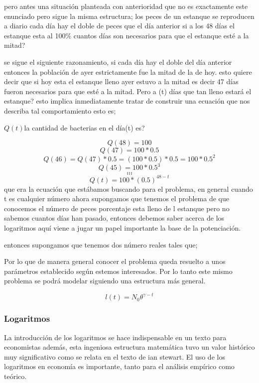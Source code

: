 \documentclass[12pt]{article}
\begin{document}
{pero antes una situación planteada con anterioridad que no es exactamente este enunciado pero sigue la misma estructura; los peces de un estanque se reproducen a diario cada día hay el doble de peces que el día anterior si a los 48 días el estanque esta al 100\% cuantos días son necesarios para que el estanque esté  a la mitad?

se sigue el siguiente razonamiento, si cada día hay el doble del día anterior entonces la población de ayer estrictamente fue la mitad de la de hoy. esto quiere decir que si hoy esta el estanque lleno ayer estuvo a la mitad es decir 47 días fueron necesarios para que esté a la mitad. Pero a (t) días que tan lleno estará el estanque? esto implica inmediatamente tratar de construir una ecuación que nos describa tal comportamiento esto es;

$Q(t)$la cantidad de bacterias en el día(t) es?

$$Q(48)=100$$ 
$$Q(47)=100*0.5$$
$$Q(46)=Q(47)*0.5= (100*0.5)*0.5 = 100*0.5^2$$
$$Q(45)=100*0.5^3$$
$$...$$
$$...$$
$$...$$
$$Q(t)=100*(0.5)^{48-t}$$
que era la ecuación que estábamos buscando para el problema, en general cuando t es cualquier número ahora supongamos que tenemos el problema de que conocemos el número de peces porcentaje esta lleno de l estanque pero no sabemos cuantos días han pasado, entonces debemos saber acerca de los logaritmos aquí viene a jugar un papel importante la base de la potenciación.


entonces supongamos que tenemos dos número reales tales que;



Por lo que de manera general conocer el problema queda resuelto a unos parámetros establecido según estemos interesados. Por lo tanto este mismo problema se podrá modelar siguiendo una estructura más general.


$$l(t)=N_{0} \theta^{\gamma-t}$$

\subsubsection{Logaritmos} 
 
 
 

La introducción de los logaritmos se hace indispensable en un texto para economistas además, esta ingeniosa estructura matemática tuvo un valor histórico muy significativo como se relata en el texto de ian stewart. El uso de los logaritmos en economía es importante, tanto para el análisis empírico como teórico.

}
\end{document}
